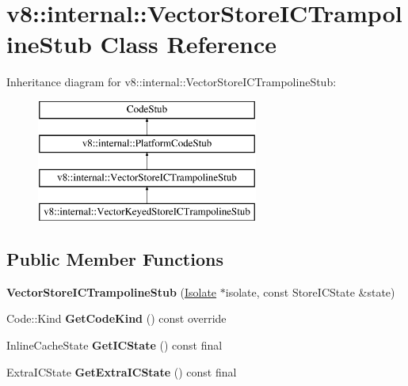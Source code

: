 \hypertarget{classv8_1_1internal_1_1_vector_store_i_c_trampoline_stub}{}\section{v8\+:\+:internal\+:\+:Vector\+Store\+I\+C\+Trampoline\+Stub Class Reference}
\label{classv8_1_1internal_1_1_vector_store_i_c_trampoline_stub}
Inheritance diagram for v8\+:\+:internal\+:\+:Vector\+Store\+I\+C\+Trampoline\+Stub\+:\begin{figure}[H]
\begin{center}
\leavevmode
\includegraphics[height=4.000000cm]{classv8_1_1internal_1_1_vector_store_i_c_trampoline_stub}
\end{center}
\end{figure}
\subsection*{Public Member Functions}
\begin{DoxyCompactItemize}
\item 
{\bfseries Vector\+Store\+I\+C\+Trampoline\+Stub} (\hyperlink{classv8_1_1internal_1_1_isolate}{Isolate} $\ast$isolate, const Store\+I\+C\+State \&state)\hypertarget{classv8_1_1internal_1_1_vector_store_i_c_trampoline_stub_a1734149b08f475e2c325625ceda6d20a}{}\label{classv8_1_1internal_1_1_vector_store_i_c_trampoline_stub_a1734149b08f475e2c325625ceda6d20a}

\item 
Code\+::\+Kind {\bfseries Get\+Code\+Kind} () const  override\hypertarget{classv8_1_1internal_1_1_vector_store_i_c_trampoline_stub_a4fec85c5c1f3111a40d383e533286858}{}\label{classv8_1_1internal_1_1_vector_store_i_c_trampoline_stub_a4fec85c5c1f3111a40d383e533286858}

\item 
Inline\+Cache\+State {\bfseries Get\+I\+C\+State} () const  final\hypertarget{classv8_1_1internal_1_1_vector_store_i_c_trampoline_stub_a6444ff635adb33ed5b0b40c51c5e33d5}{}\label{classv8_1_1internal_1_1_vector_store_i_c_trampoline_stub_a6444ff635adb33ed5b0b40c51c5e33d5}

\item 
Extra\+I\+C\+State {\bfseries Get\+Extra\+I\+C\+State} () const  final\hypertarget{classv8_1_1internal_1_1_vector_store_i_c_trampoline_stub_a783390701169b837037c207af0bcfd10}{}\label{classv8_1_1internal_1_1_vector_store_i_c_trampoline_stub_a783390701169b837037c207af0bcfd10}

\end{DoxyCompactItemize}
